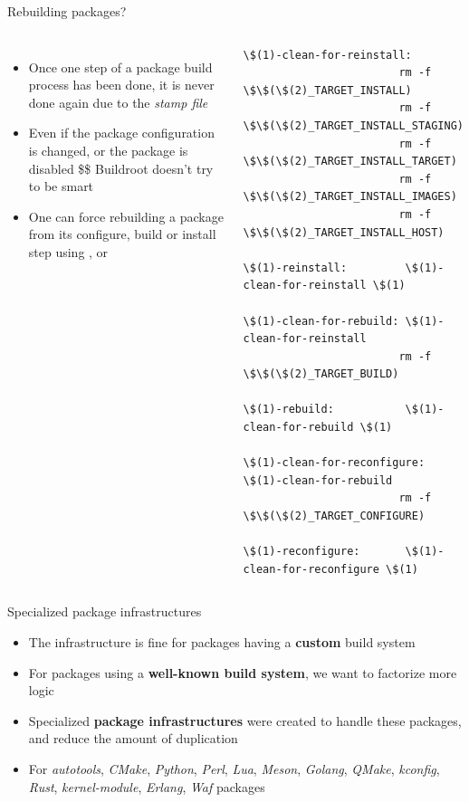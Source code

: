 \begin{frame}[fragile]{Rebuilding packages?}
  \begin{columns}
  \begin{itemize}
  \item Once one step of a package build process has been done, it is
    never done again due to the {\em stamp file}
  \item Even if the package configuration is changed, or the package
    is disabled \$\rightarrow\$ Buildroot doesn't try to be smart
  \item One can force rebuilding a package from its configure, build
    or install step using ,
     or 
  \end{itemize}
  \begin{block}{}
\begin{verbatim}
\$(1)-clean-for-reinstall:
                        rm -f \$\$(\$(2)_TARGET_INSTALL)
                        rm -f \$\$(\$(2)_TARGET_INSTALL_STAGING)
                        rm -f \$\$(\$(2)_TARGET_INSTALL_TARGET)
                        rm -f \$\$(\$(2)_TARGET_INSTALL_IMAGES)
                        rm -f \$\$(\$(2)_TARGET_INSTALL_HOST)

\$(1)-reinstall:         \$(1)-clean-for-reinstall \$(1)

\$(1)-clean-for-rebuild: \$(1)-clean-for-reinstall
                        rm -f \$\$(\$(2)_TARGET_BUILD)

\$(1)-rebuild:           \$(1)-clean-for-rebuild \$(1)

\$(1)-clean-for-reconfigure: \$(1)-clean-for-rebuild
                        rm -f \$\$(\$(2)_TARGET_CONFIGURE)

\$(1)-reconfigure:       \$(1)-clean-for-reconfigure \$(1)
\end{verbatim}
  \end{block}
  \end{columns}
\end{frame}

\begin{frame}{Specialized package infrastructures}
  \begin{itemize}
  \item The  infrastructure is fine for packages
    having a {\bf custom} build system
  \item For packages using a {\bf well-known build system}, we want
    to factorize more logic
  \item Specialized {\bf package infrastructures} were created to
    handle these packages, and reduce the amount of duplication
  \item For {\em autotools}, {\em CMake}, {\em Python}, {\em Perl},
    {\em Lua}, {\em Meson}, {\em Golang}, {\em QMake}, {\em kconfig},
    {\em Rust}, {\em kernel-module}, {\em Erlang}, {\em Waf}
    packages
  \end{itemize}
\end{frame}


